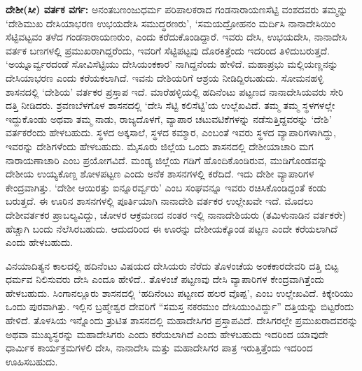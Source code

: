 \textbf{ದೇಶೀ(ಸೀ) ವರ್ತಕ ವರ್ಗ:} ಅನಂತಬಣಂಜುಧರ್ಮ ಪರಿಪಾಲಕರಾದ ಗಂಡನಾರಾಯಣಸೆಟ್ಟಿ ವಂಶದವರು ತಮ್ಮನ್ನು ‘ದೇಶಿಮುಖ ದೇಸಿಯಾಭರಣ ಉಭಯದೇಸಿ ಸಮುದ್ಧರಣರು’, ‘ಸಮಯದ್ರೋಹನಂ ಮರ್ದಿಸಿ ನಾನಾದೇಸಿಯಿಂ ಸೆಟ್ಟಿವಟ್ಟವಂ ತಳೆದ ಗಂಡನಾರಾಯಣರುಂ, ಎಂದು ಕರೆದುಕೊಂಡಿದ್ದಾರೆ. ಇವರು ದೇಸಿ, ಉಭಯದೇಸಿ, ನಾನಾದೇಸಿ ವರ್ತಕ ಬಣಗಳಲ್ಲಿ ಪ್ರಮುಖರಾಗಿದ್ದರೆಂದು, ಇವರಿಗೆ ಸೆಟ್ಟಿಪಟ್ಟವು ದೊರಕಿತ್ತೆಂದು ಇದರಿಂದ ತಿಳಿದುಬರುತ್ತದೆ. ‘ಅಯ್ನೂರ್ವ್ವರದಂಡೆ ಸೋವಿಸೆಟ್ಟಿಯು ದೇಸಿಯಂಕಕಾರ’ ನಾಗಿದ್ದನೆಂದು ಹೇಳಿದೆ. ಮಹಾಪ್ರಭು ಮಲ್ಲಿಯಣ್ಣನನ್ನು ದೇಸಿಯಾಭರಣ ಎಂದು ಕರೆಯಕಲಾಗಿದೆ. ಇವನು ದೇಶಿಯರಿಗೆ ಆಶ್ರಯ ನೀಡಿದ್ದಿರಬಹುದು. ಸೋಮನಹಳ್ಳಿ ಶಾಸನದಲ್ಲಿ ‘ದೇಶಿಯ’ ವರ್ತಕರ ಪ್ರಸ್ತಾಪ ಇದೆ. ಮಾರೆಹಳ್ಳಿಯಲ್ಲಿ ಹದಿನೆಂಟು ಪಟ್ಟಣದ ನಾನಾದೇಸಿಯವರು ಸೇರಿ ದತ್ತಿ ನೀಡಿದರು. ಶ್ರವಣಬೆಳಗೊಳ ಶಾಸನದಲ್ಲಿ ‘ದೇಸಿ ಸೆಟ್ಟಿ ಕಲಿಸೆಟ್ಟಿ’ಯ ಉಲ್ಲೆಖವಿದೆ. ತಮ್ಮ ತಮ್ಮ ಸ್ಥಳಗಳಲ್ಲೇ ಇದ್ದುಕೊಂಡು ಅಥವಾ ತಮ್ಮ ನಾಡು, ರಾಜ್ಯದೊಳಗೆ, ವ್ಯಾಪಾರ ಚಟುವಟಿಕೆಗಳನ್ನು ನಡೆಸುತ್ತಿದ್ದವರನ್ನು ‘ದೇಶಿ’ ವರ್ತಕರೆಂದು ಹೇಳಬಹುದು. ಸ್ಥಳದ ಅಕ್ಕಸಾಲೆ, ಸ್ಥಳದ ಕಮ್ಮಾರ, ಎಂಬಂತೆ ಇವರು ಸ್ಥಳದ ವ್ಯಾಪಾರಿಗಳಾಗಿದ್ದು, ಇವರನ್ನು ದೇಶಿಗಳೆಂದು ಹೇಳಬಹುದು. ಮೈಸೂರು ಜಿಲ್ಲೆಯ ಒಂದು ಶಾಸನದಲ್ಲಿ ದೇಶೀಯಾಚಾರಿ ಮಗ ನಾರಾಯಣಾಚಾರಿ ಎಂಬ ಪ್ರಯೋಗವಿದೆ. ಮಂಡ್ಯ ಜಿಲ್ಲೆಯ ಗಡಿಗೆ ಹೊಂದಿಕೊಂಡಿರುವ, ಮುಡಿಗೊಂಡವನ್ನು ದೇಶೀಯ ಉಯ್ಯಕೊಣ್ದ ಶೋಳಪಟ್ಟಣ ಎಂದು ಅನೆಕ ಶಾಸನಗಳಲ್ಲಿ ಕರೆದಿದೆ. ಇದು ದೇಶೀ ವ್ಯಾಪಾರಿಗಳ ಕೇಂದ್ರವಾಗಿತ್ತು. ‘ದೇಶೀ ಆಯಿರತ್ತು ಐನ್ನೂರರ್ವ್ವರು’ ಎಂಬ ಸಂಘವನ್ನೂ ಇವರು ರಚಿಸಿಕೊಂಡಿದ್ದಂತೆ ಕಂಡು ಬರುತ್ತದೆ. ಈ ಊರಿನ ಶಾಸನಗಳಲ್ಲಿ ಪೂರ್ತಿಯಾಗಿ ನಾನಾದೇಶಿ ವರ್ತಕರ ಉಲ್ಲೇಖವೇ ಇದೆ. ಮೊದಲು ದೇಶೀವರ್ತಕರ ಪ್ರಾಬಲ್ಯವಿದ್ದು, ಚೋಳರ ಆಕ್ರಮಣದ ನಂತರ ಇಲ್ಲಿ ನಾನಾದೇಶಿಯರು (ತಮಿಳುನಾಡಿನ ವರ್ತಕರೇ) ಹೆಚ್ಚಾಗಿ ಬಂದು ನೆಲೆಸಿರಬಹುದು. ಆದುದರಿಂದ ಈ ಊರನ್ನು ದೇಶೀಯಕ್ಕೊಂಡ ಪಟ್ಟಣ ಎಂದೇ ಕರೆಯಲಾಗಿದೆ ಎಂದು ಹೇಳಬಹುದು. 

ವಿನಯಾದಿತ್ಯನ ಕಾಲದಲ್ಲಿ ಹದಿನೆಂಟು ವಿಷಯದ ದೇಸಿಯರು ನೆರೆದು ತೊಳಂಚೆಯ ಅಂಕಕಾರದೇವರಿ ದತ್ತಿ ಬಿಟ್ಟ ಧರ್ಮವ ನಿಲಿಸುವರು ದೇಸಿ ಎಂದೂ ಹೇಳಿದೆ.. ತೊಳಂಚೆ ಪಟ್ಟಣವು ದೇಸಿ ವ್ಯಾಪಾರಿಗಳ ಕೇಂದ್ರವಾಗಿತ್ತೆಂದು ಹೇಳಬಹುದು. ಸಿಂಗಾನಲ್ಲೂರು ಶಾಸನದಲ್ಲಿ ‘ಹದಿನೆಂಟು ಪಟ್ಟಣದ ಹಲರ ವೊಪ್ಪ’, ಎಂಬ ಉಲ್ಲೇಖವಿದೆ. ಕಿಕ್ಕೇರಿಯು ಒಂದು ಪುರವಾಗಿತ್ತು. ಇಲ್ಲಿನ ಬ್ರಹ್ಮೇಶ್ವರ ದೇವರಿಗೆ “ಸಮಸ್ತ ನಕರಮುಂ ದೇಸಿಯುಂವಿರ್ದ್ದು” ದತ್ತಿಯನ್ನು ಬಿಟ್ಟರೆಂದು ಹೇಳಿದೆ. ತೊಳಸಿಯ ಇನ್ನೊಂದು ತ್ರುಟಿತ ಶಾಸನದಲ್ಲಿ ಮಹಾದೇಸಿಗರ ಪ್ರಸ್ತಾಪವಿದೆ. ದೇಸಿಗರಲ್ಲೇ ಪ್ರಮುಖರಾದವರನ್ನು ಅಥವಾ ಮುಖ್ಯಸ್ಥರನ್ನು ಮಹಾದೇಸಿಗರು ಎಂದು ಕರೆಯಲಾಗಿದೆ ಎಂದು ಹೇಳಬಹುದು ಇದರಿಂದ ಯಾವುದೇ ಧಾರ್ಮಿಕ ಕಾರ್ಯಕ್ರಮಗಳಲಿ ದೇಸಿ, ನಾನಾದೇಸಿ ಮತ್ತು ಮಹಾದೇಸಿಗರ ಪಾತ್ರ ಇರುತ್ತಿತ್ತೆಂದು ಇದರಿಂದ ಊಹಿಸಬಹುದು.

